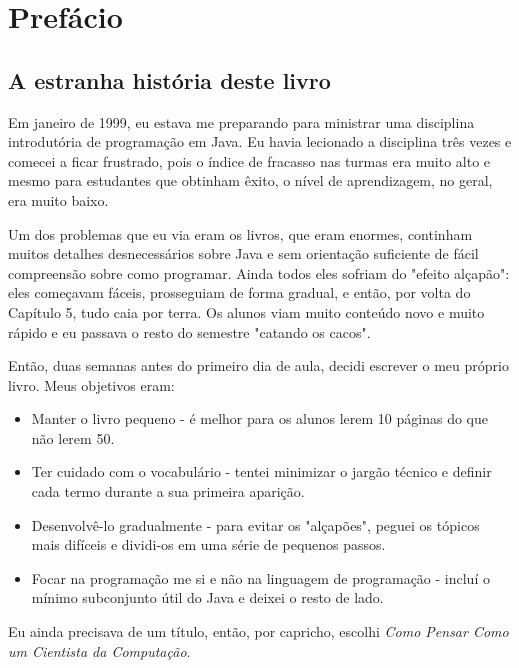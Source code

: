\documentclass[10pt]{book}
\begin{document}
\chapter{Prefácio}

\section*{A estranha história deste livro}

Em janeiro de 1999, eu estava me preparando para ministrar uma disciplina introdutória de
programação em Java. Eu havia lecionado a disciplina três vezes e comecei a ficar
frustrado, pois o índice de fracasso nas turmas era muito alto e mesmo para
estudantes que obtinham êxito, o nível de aprendizagem, no geral, era muito baixo.

Um dos problemas que eu via eram os livros, que
eram enormes, continham muitos detalhes desnecessários sobre Java e
sem orientação suficiente de fácil compreensão sobre como programar. Ainda todos eles
sofriam do "efeito alçapão": eles começavam fáceis,
prosseguiam de forma gradual, e então, por volta do Capítulo 5, tudo
caia por terra. Os alunos viam muito conteúdo novo e muito rápido
e eu passava o resto do semestre "catando os cacos".

Então, duas semanas antes do primeiro dia de aula, decidi escrever o meu
próprio livro.
Meus objetivos eram:

\begin{itemize}

\item Manter o livro pequeno - é melhor para os alunos lerem 10 páginas
do que não lerem 50.

\item Ter cuidado com o vocabulário - tentei minimizar o jargão técnico
e definir cada termo durante a sua primeira aparição.

\item Desenvolvê-lo gradualmente - para evitar os "alçapões", peguei os tópicos
mais difíceis e dividi-os em uma série de pequenos passos.

\item Focar na programação me si e não na linguagem de programação - incluí
o mínimo subconjunto útil do Java e deixei o resto de lado.

\end{itemize}

Eu ainda precisava de um título, então, por capricho, escolhi {\em Como Pensar Como
um Cientista da Computação}.
\end{document}
